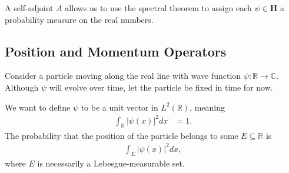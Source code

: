 \documentclass[10pt]{extarticle}
\newcommand{\R}{\mathbb{R}}
\newcommand{\C}{\mathbb{C}}
\theoremstyle{plain}
\theoremstyle{definition}
\theoremstyle{remark}
\renewcommand{\newline}{\hfill\break}
\begin{document}
  A self-adjoint $A$ allows us to use the spectral theorem to assign each $\psi \in \mathbf{H}$ a probability measure on the real numbers.
  \subsection{Position and Momentum Operators}%
  Consider a particle moving along the real line with wave function $\psi: \R\rightarrow \C$. Although $\psi$ will evolve over time, let the particle be fixed in time for now.\newline

  We want to define $\psi$ to be a unit vector in $L^{2}(\R)$, meaning
  \begin{align*}
    \int_{\R}\left\vert \psi(x) \right\vert^2dx &= 1.
  \end{align*}
  The probability that the position of the particle belongs to some $E\subseteq \R$ is
  \begin{align*}
    \int_{E}\left\vert \psi(x) \right\vert^2dx,
  \end{align*}
  where $E$ is necessarily a Lebesgue-measurable set.\newline
\end{document}
